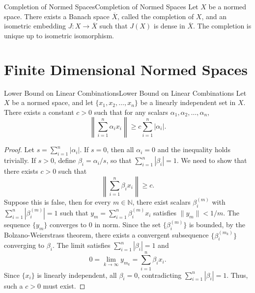 \documentclass[../main.tex]{subfiles}
\begin{document}
\begin{theorem}{Completion of Normed Spaces}{Completion of Normed Spaces}
	Let $X$ be a normed space. There exists a Banach space $\overline{X}$, called the completion of $X$, and an isometric embedding $J: X \rightarrow \overline{X}$ such that $J(X)$ is dense in $\overline{X}$. The completion is unique up to isometric isomorphism.
\end{theorem}

\section{Finite Dimensional Normed Spaces}

\begin{lemma}{Lower Bound on Linear Combinations}{Lower Bound on Linear Combinations}
	Let $X$ be a normed space, and let $\{x_1, x_2, \ldots, x_n\}$ be a linearly independent set in $X$. There exists a constant $c > 0$ such that for any scalars $\alpha_1, \alpha_2, \ldots, \alpha_n$,
	\begin{equation*}
		\left\|\sum_{i=1}^n \alpha_i x_i\right\| \geq c \sum_{i=1}^n |\alpha_i|.
	\end{equation*}
\end{lemma}
\begin{proof}
	Let $s = \sum_{i=1}^n |\alpha_i|$. If $s = 0$, then all $\alpha_i = 0$ and the inequality holds trivially. If $s > 0$, define $\beta_i = \alpha_i / s$, so that $\sum_{i=1}^n |\beta_i| = 1$. We need to show that there exists $c > 0$ such that
	\begin{equation*}
		\left\|\sum_{i=1}^n \beta_i x_i\right\| \geq c.
	\end{equation*}
	Suppose this is false, then for every $m \in \mathbb{N}$, there exist scalars $\beta_i^{(m)}$ with $\sum_{i=1}^n |\beta_i^{(m)}| = 1$ such that $y_m = \sum_{i=1}^n \beta_i^{(m)} x_i$ satisfies $\|y_m\| < 1/m$. The sequence $\{y_m\}$ converges to $0$ in norm. Since the set $\{\beta_i^{(m)}\}$ is bounded, by the Bolzano-Weierstrass theorem, there exists a convergent subsequence $\{\beta_i^{(m_k)}\}$ converging to $\beta_i$. The limit satisfies $\sum_{i=1}^n |\beta_i| = 1$ and
	\begin{equation*}
		0 = \lim_{k \to \infty} y_{m_k} = \sum_{i=1}^n \beta_i x_i.
	\end{equation*}
	Since $\{x_i\}$ is linearly independent, all $\beta_i = 0$, contradicting $\sum_{i=1}^n |\beta_i| = 1$. Thus, such a $c > 0$ must exist.
\end{proof}
\end{document}

